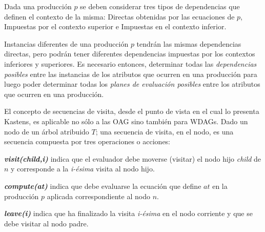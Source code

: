 \documentclass[runningheads,a4paper]{llncs}
\newcommand{\maggen}{\textbf{magGen}}
\begin{document}
Dada una producción $p$ se deben considerar tres tipos de dependencias que definen el contexto de la misma: Directas obtenidas por las ecuaciones de $p$, Impuestas por el contexto superior e Impuestas en el contexto inferior.

Instancias diferentes de una producción $p$ tendrán las mismas dependencias directas, pero podrán tener diferentes dependencias impuestas por los contextos inferiores y superiores. Es necesario entonces, determinar todas las \emph{dependencias posibles} entre las instancias de los atributos que ocurren en una producción para luego poder determinar todas los \emph{planes de evaluación posibles} entre los atributos que ocurren en una producción.




El concepto de secuencias de visita, desde el punto de vista en el cual lo presenta Kastens, es aplicable no sólo a las OAG sino también para WDAGs.
Dado un nodo de un árbol atribuido $T$; una secuencia de visita, en el nodo, es una secuencia compuesta por tres operaciones o acciones: 

\begin{description}
\item \emph{\textbf{visit(child,i)}} indica que el evaluador debe moverse (visitar) el nodo hijo \emph{child} de $n$ y corresponde a la \emph{i-ésima} visita al nodo hijo.

\item \emph{\textbf{compute(at)}} indica que debe evaluarse la ecuación que define $at$ en la producción $p$ aplicada correspondiente al nodo $n$.

\item \emph{\textbf{leave(i)}} indica que ha finalizado la visita \emph{i-ésima} en el nodo corriente y que se debe visitar al nodo padre.
\end{description}
\end{document}
